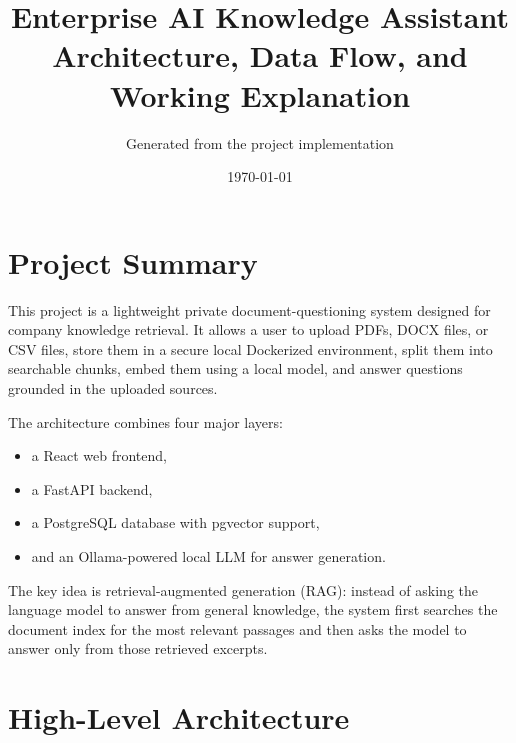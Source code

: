 \documentclass[11pt,a4paper]{article}
\begin{document}
\title{\textbf{Enterprise AI Knowledge Assistant}\\Architecture, Data Flow, and Working Explanation}
\author{Generated from the project implementation}
\date{\today}

\maketitle

\section{Project Summary}
This project is a lightweight private document-questioning system designed for company knowledge retrieval. It allows a user to upload PDFs, DOCX files, or CSV files, store them in a secure local Dockerized environment, split them into searchable chunks, embed them using a local model, and answer questions grounded in the uploaded sources.

The architecture combines four major layers:

\begin{itemize}[leftmargin=1.5em]
    \item a React web frontend,
    \item a FastAPI backend,
    \item a PostgreSQL database with pgvector support,
    \item and an Ollama-powered local LLM for answer generation.
\end{itemize}

The key idea is retrieval-augmented generation (RAG): instead of asking the language model to answer from general knowledge, the system first searches the document index for the most relevant passages and then asks the model to answer only from those retrieved excerpts.

\section{High-Level Architecture}
\end{document}

